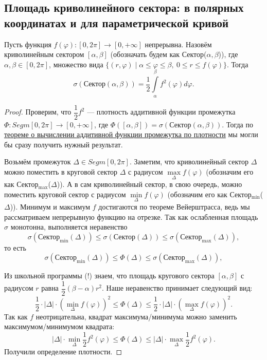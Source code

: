 \subsection{Площадь криволинейного сектора: в полярных координатах и для параметрической кривой}

\begin{theorem}
	Пусть функция \(f(\varphi) \colon [0, 2\pi] \to [0, +\infty]\) непрерывна. Назовём криволинейным сектором \([\alpha, \beta]\) (обозначать будем как Сектор(\(\alpha, \beta\))), где \(\alpha, \beta \in [0, 2\pi]\), множество вида \(\{(r, \varphi) \mid \alpha \leqslant \varphi \leqslant \beta, \ 0 \leqslant r \leqslant f(\varphi)\}\). Тогда
	\begin{equation} \label{sigma_1}
		\sigma(\text{Сектор}(\alpha, \beta)) = \frac{1}{2}\int\limits_\alpha^\beta f^2(\varphi) d\varphi.
	\end{equation}
\end{theorem}

\begin{proof}
	Проверим, что \(\dfrac{1}{2}f^2\) --- плотность аддитивной функции промежутка \(\Phi \colon Segm [0, 2\pi] \to [0, +\infty]\), где \(\Phi([\alpha, \beta]) = \sigma(\text{Сектор}(\alpha, \beta))\). Тогда по \hyperlink{afp}{теореме о вычислении аддитивной функции промежутка по плотности} мы могли бы сразу получить нужный результат.
	
	Возьмём промежуток \(\Delta \in Segm [0, 2\pi]\). Заметим, что криволинейный сектор \(\Delta\) можно поместить в круговой сектор \(\Delta\) с радиусом \(\max\limits_\Delta f(\varphi)\) (обозначим его как Сектор\(_{\max}\)(\(\Delta\))). А в сам криволинейный сектор, в свою очередь, можно поместить круговой сектор с радиусом \(\min\limits_\Delta f(\varphi)\) (обозначим его как Сектор\(_{\min}\)(\(\Delta\))). Минимум и максимум \(f\) достигаются по теореме Вейерштрасса, ведь мы рассматриваем непрерывную функцию на отрезке. Так как ослабленная площадь \(\sigma\) монотонна, выполняется неравенство \[
		\sigma(\text{Сектор}_{\min}(\Delta)) \leqslant \sigma(\text{Сектор}(\Delta)) \leqslant \sigma(\text{Сектор}_{\max}(\Delta)),
	\]
	то есть \[
		\sigma(\text{Сектор}_{\min}(\Delta)) \leqslant \Phi(\Delta) \leqslant \sigma(\text{Сектор}_{\max}(\Delta)),
	\]
	
	Из школьной программы (!) знаем, что площадь кругового сектора \([\alpha, \beta]\) с радиусом \(r\) равна \(\dfrac{1}{2} (\beta - \alpha) r^2\). Наше неравенство принимает следующий вид: \[
		\frac{1}{2} \cdot |\Delta| \cdot (\min_\Delta f(\varphi))^2 \leqslant \Phi(\Delta) \leqslant \frac{1}{2} \cdot |\Delta| \cdot (\max_\Delta f(\varphi))^2.
	\]
	Так как \(f\) неотрицательна, квадрат максимума/минимума можно заменить максимумом/минимумом квадрата: \[
		|\Delta| \cdot \min_\Delta \frac{1}{2} f^2(\varphi) \leqslant \Phi(\Delta) \leqslant |\Delta| \cdot \max_\Delta \frac{1}{2} f^2(\varphi).
	\]
	Получили определение плотности.
\end{proof}

